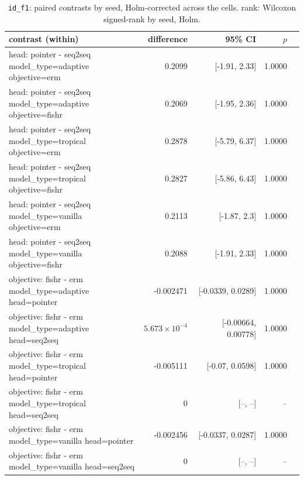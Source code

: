\documentclass[10pt]{article}
\begin{document}
{\small
\begin{longtable}{lrrrl}
\caption{\texttt{id\_f1}: paired contrasts by seed, Holm-corrected across the cells. rank: Wilcoxon signed-rank by seed, Holm.}\label{tab:paired-id_f1}\\
\toprule
contrast (within) & difference & 95\% CI & $p$ & \\
\midrule
\endhead
\makecell[l]{head: pointer - seq2seq\\\footnotesize model\_type=adaptive objective=erm } & 0.2099 & [-1.91, 2.33] & 1.0000 & \\
\makecell[l]{head: pointer - seq2seq\\\footnotesize model\_type=adaptive objective=fishr } & 0.2069 & [-1.95, 2.36] & 1.0000 & \\
\makecell[l]{head: pointer - seq2seq\\\footnotesize model\_type=tropical objective=erm } & 0.2878 & [-5.79, 6.37] & 1.0000 & \\
\makecell[l]{head: pointer - seq2seq\\\footnotesize model\_type=tropical objective=fishr } & 0.2827 & [-5.86, 6.43] & 1.0000 & \\
\makecell[l]{head: pointer - seq2seq\\\footnotesize model\_type=vanilla objective=erm } & 0.2113 & [-1.87, 2.3] & 1.0000 & \\
\makecell[l]{head: pointer - seq2seq\\\footnotesize model\_type=vanilla objective=fishr } & 0.2088 & [-1.91, 2.33] & 1.0000 & \\
\makecell[l]{objective: fishr - erm\\\footnotesize model\_type=adaptive head=pointer } & -0.002471 & [-0.0339, 0.0289] & 1.0000 & \\
\makecell[l]{objective: fishr - erm\\\footnotesize model\_type=adaptive head=seq2seq } & $5.673\times10^{-4}$ & [-0.00664, 0.00778] & 1.0000 & \\
\makecell[l]{objective: fishr - erm\\\footnotesize model\_type=tropical head=pointer } & -0.005111 & [-0.07, 0.0598] & 1.0000 & \\
\makecell[l]{objective: fishr - erm\\\footnotesize model\_type=tropical head=seq2seq } & 0 & [--, --] & -- & \\
\makecell[l]{objective: fishr - erm\\\footnotesize model\_type=vanilla head=pointer } & -0.002456 & [-0.0337, 0.0287] & 1.0000 & \\
\makecell[l]{objective: fishr - erm\\\footnotesize model\_type=vanilla head=seq2seq } & 0 & [--, --] & -- & \\
\bottomrule
\end{longtable}
}
\end{document}
